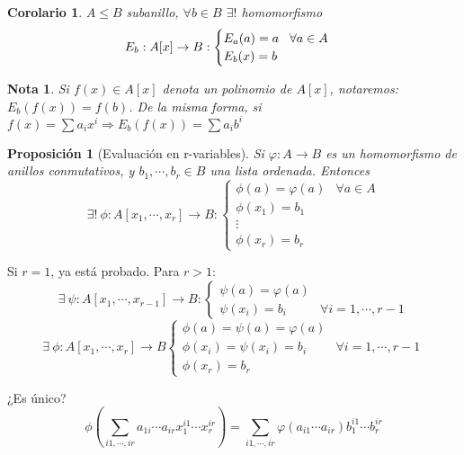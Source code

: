 \documentclass[11pt, a4paper, titlepage]{article}
\makeatletter
\renewenvironment{proof}[1][\proofname] {\vspace{-15pt}\par\pushQED{\qed}\normalfont\topsep6\p@\@plus6\p@\relax\trivlist\item[\hskip\labelsep\it#1\@addpunct{.}]\ignorespaces}{\popQED\endtrivlist\@endpefalse}
\theoremstyle{theorem-style}
\newtheorem*{nprop}{Proposición}
\newtheorem{ncor}{Corolario}
\theoremstyle{definition-style}
\theoremstyle{remark-style}
\newtheorem*{nota}{Nota}
\theoremstyle{example-style}
\makeatother
\begin{document}
\begin{ncor}
	$A \leq B$ subanillo, $\forall b \in B$ $\exists !$ homomorfismo
\[
E_b: A[x] \to B: \begin{cases}
E_a(a) = a \hspace{0.3cm} \forall a \in A\\
E_b(x) = b
	
\end{cases}
\] 
\end{ncor}

\begin{nota}
	Si $f(x)\in A[x]$ denota un polinomio de $A[x]$, notaremos: $E_b(f(x)) = f(b)$.
	De la misma forma, si $f(x) = \sum a_i x^i \Rightarrow E_b(f(x)) = \sum a_i b^i$
\end{nota}


\begin{nprop}[Evaluación en r-variables]
  Si $\varphi : A \longrightarrow B$ es un homomorfismo de anillos conmutativos, y $b_1,\cdots, b_r \in B$ una lista ordenada. Entonces
  \[
    \exists!\ \phi : A[x_1,\cdots,x_r] \longrightarrow B :\begin{cases}
      \phi(a) = \varphi(a) & \forall a\in A\\
      \phi(x_1) = b_1\\
      \vdots\\
      \phi(x_r) = b_r
    \end{cases}
  \]
\end{nprop}

\begin{proof}
  Si $r=1$, ya está probado. Para $r>1$:
  \[
    \exists\ \psi : A[x_1,\cdots,x_{r-1}] \longrightarrow B : \begin{cases}
      \psi(a) = \varphi(a)\\
      \psi(x_i) = b_i & \forall i=1,\cdots,r-1
    \end{cases}
  \]
  \[  \exists\ \phi : A[x_1,\cdots,x_r] \longrightarrow B \begin{cases}
      \phi(a) = \psi(a) = \varphi(a)\\
      \phi(x_i) = \psi(x_i) = b_i &\forall i=1,\cdots,r-1\\
      \phi(x_r) = b_r
    \end{cases}
  \]
  
  ¿Es único?
  \[
    \phi(\sum_{i1,\cdots,ir} a_{1i}\cdots a_{ir}x_1^{i1}\cdots x_r^{ir} )= \sum _{i1,\cdots,ir} \varphi(a_{i1}\cdots a_{ir})b_1^{i1}\cdots b_r^{ir}
  \]
\end{proof}
\end{document}

